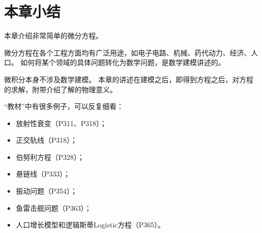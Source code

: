 \section{本章小结}

本章介绍非常简单的微分方程。

微分方程在各个工程方面均有广泛用途，如电子电路、机械、药代动力、经济、人口。
如何将某个领域的具体问题转化为数学问题，是数学建模讲述的。

微积分本身不涉及数学建模。
本章的讲述在建模之后，即得到方程之后，对方程的求解，附带介绍了解的物理意义。

“教材\cite{book1}”中有很多例子，可以反复细看：
\begin{itemize}
    \item 放射性衰变（P311、P318）；
    \item 正交轨线（P318）；
    \item 伯努利方程（P328）；
    \item 悬链线（P333）；
    \item 振动问题（P354）；
    \item 鱼雷击舰问题（P363）；
    \item 人口增长模型和逻辑斯蒂Logistic方程（P365）。
\end{itemize}




